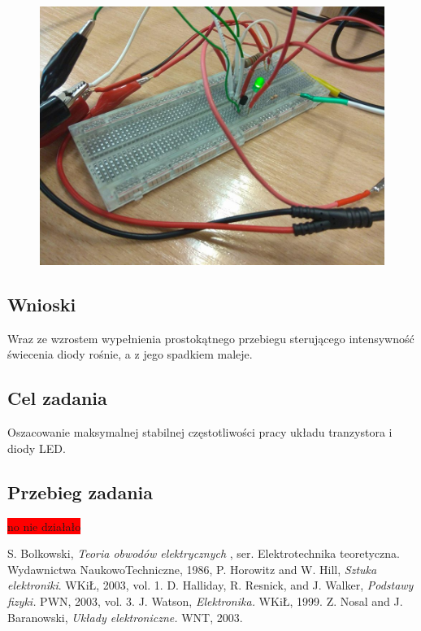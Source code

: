 \documentclass[polish,polish,a4paper]{article}
\begin{document}
\begin{figure}[H]
	\centering
	\includegraphics[scale=0.3]{diodadladuzego.jpg}
\end{figure}

\subsection{Wnioski}

Wraz ze wzrostem wypełnienia prostokątnego przebiegu sterującego intensywność świecenia diody rośnie, a z jego spadkiem maleje.

\subsection{Cel zadania}
Oszacowanie maksymalnej stabilnej częstotliwości pracy układu tranzystora i diody LED.

\subsection{Przebieg zadania}

{\LARGE \colorbox{red}{no nie działało}}

	\begin{thebibliography}{99}
		S. Bolkowski,  \emph{Teoria obwodów elektrycznych} , ser. Elektrotechnika teoretyczna. Wydawnictwa NaukowoTechniczne,
		1986, 
		P. Horowitz and W. Hill, \emph{Sztuka elektroniki}. WKiŁ, 2003, vol. 1.
		D. Halliday, R. Resnick, and J. Walker, \emph{Podstawy fizyki.} PWN, 2003, vol. 3.
		J. Watson,\emph{ Elektronika.} WKiŁ, 1999.
		Z. Nosal and J. Baranowski, \emph{Układy elektroniczne.} WNT, 2003.
	\end{thebibliography}
	\newpage
	\tableofcontents
		
\end{document}
